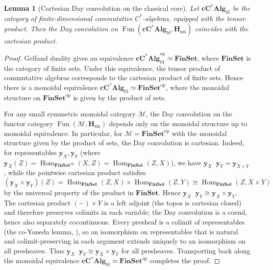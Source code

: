 \documentclass[12pt,a4paper]{article}
\theoremstyle{plain}
\newtheorem{lemma}[theorem]{Lemma}
\theoremstyle{definition}
\DeclareMathOperator{\Fun}{Fun}
\DeclareMathOperator{\Day}{\otimes_{\mathrm{Day}}}
\DeclareMathOperator{\Hom}{Hom}
\newcommand{\cCAlg}{\mathbf{cC^{*}Alg}_{\mathrm{fd}}}
\newcommand{\FinSet}{\mathbf{FinSet}}
\begin{document}
\begin{lemma}[Cartesian Day convolution on the classical core]\label{lem:cartesian}
Let \(\cCAlg\) be the category of finite‑dimensional commutative \(C^{*}\)-algebras, equipped with the tensor product.  Then the Day convolution on \(\Fun(\cCAlg,\mathbf{H}_{\mathrm{sm}})\) coincides with the cartesian product.
\end{lemma}

\begin{proof}
Gelfand duality gives an equivalence \(\cCAlg^{\mathrm{op}} \simeq \FinSet\), where \(\FinSet\) is the category of finite sets.  Under this equivalence, the tensor product of commutative algebras corresponds to the cartesian product of finite sets.  Hence there is a monoidal equivalence \(\cCAlg \simeq \FinSet^{\mathrm{op}}\), where the monoidal structure on \(\FinSet^{\mathrm{op}}\) is given by the product of sets.

For any small symmetric monoidal category \(\mathcal{M}\), the Day convolution on the functor category \(\Fun(\mathcal{M},\mathbf{H}_{\mathrm{sm}})\) depends only on the monoidal structure up to monoidal equivalence.  In particular, for \(\mathcal{M} = \FinSet^{\mathrm{op}}\) with the monoidal structure given by the product of sets, the Day convolution is cartesian.  Indeed, for representables \(\mathbf{y}_X,\mathbf{y}_Y\) (where \(\mathbf{y}_X(Z) = \Hom_{\FinSet^{\mathrm{op}}}(X,Z) = \Hom_{\FinSet}(Z,X)\)), we have \(\mathbf{y}_X \Day \mathbf{y}_Y = \mathbf{y}_{X \times Y}\), while the pointwise cartesian product satisfies
\[
(\mathbf{y}_X \times \mathbf{y}_Y)(Z) = \Hom_{\FinSet}(Z,X) \times \Hom_{\FinSet}(Z,Y) \cong \Hom_{\FinSet}(Z, X\times Y)
\]
by the universal property of the product in \(\FinSet\).  Hence \(\mathbf{y}_X \Day \mathbf{y}_Y \cong \mathbf{y}_X \times \mathbf{y}_Y\).  The cartesian product $(-)\times Y$ is a left adjoint (the topos is cartesian closed) and therefore preserves colimits in each variable; the Day convolution is a coend, hence also separately cocontinuous.
Every presheaf is a colimit of representables (the co‑Yoneda lemma, \cite[Lemma~5.1.5.3]{Lurie2009}),
so an isomorphism on representables that is natural and colimit‑preserving in each argument extends uniquely to an isomorphism on all presheaves.
Thus $\mathbf{y}_X \Day \mathbf{y}_Y \cong \mathbf{y}_X \times \mathbf{y}_Y$ for all presheaves. Transporting back along the monoidal equivalence \(\cCAlg \simeq \FinSet^{\mathrm{op}}\) completes the proof. \qedhere
\end{proof}
\end{document}
